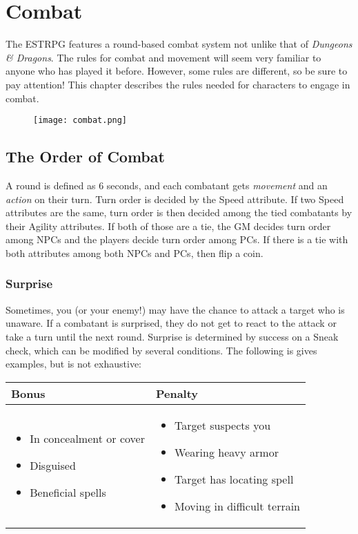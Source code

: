 \chapter{Combat}

The ESTRPG features a round-based combat system not unlike that of \textit{Dungeons \& Dragons}. The rules for combat and movement will seem very familiar to anyone who has played it before. However, some rules are different, so be sure to pay attention! This chapter describes the rules needed for characters to engage in combat.

\begin{figure}[H]
	\texttt{[image: combat.png]}
\end{figure}

\section{The Order of Combat}

A round is defined as 6 seconds, and each combatant gets \textit{movement} and an \textit{action} on their turn. Turn order is decided by the Speed attribute. If two Speed attributes are the same, turn order is then decided among the tied combatants by their Agility attributes. If both of those are a tie, the GM decides turn order among NPCs and the players decide turn order among PCs. If there is a tie with both attributes among both NPCs and PCs, then flip a coin.

\subsection{Surprise}

Sometimes, you (or your enemy!) may have the chance to attack a target who is unaware. If a combatant is surprised, they do not get to react to the attack or take a turn until the next round. Surprise is determined by success on a Sneak check, which can be modified by several conditions. The following is gives examples, but is not exhaustive:

\begin{tabular}{p{}|p{}}

Bonus & Penalty\\ \hline
	\begin{itemize}
		\item In concealment or cover
		\item Disguised
		\item Beneficial spells
	\end{itemize}
	&
	\begin{itemize}
		\item Target suspects you
		\item Wearing heavy armor
		\item Target has locating spell
		\item Moving in difficult terrain
	\end{itemize}\\

\end{tabular}

